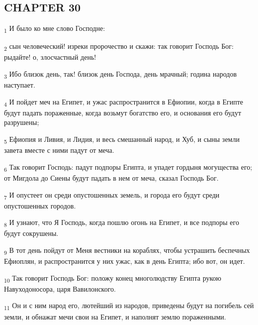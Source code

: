 \subsection{CHAPTER 30}
\begin{tcolorbox}
\textsubscript{1} И было ко мне слово Господне:
\end{tcolorbox}
\begin{tcolorbox}
\textsubscript{2} сын человеческий! изреки пророчество и скажи: так говорит Господь Бог: рыдайте! о, злосчастный день!
\end{tcolorbox}
\begin{tcolorbox}
\textsubscript{3} Ибо близок день, так! близок день Господа, день мрачный; година народов наступает.
\end{tcolorbox}
\begin{tcolorbox}
\textsubscript{4} И пойдет меч на Египет, и ужас распространится в Ефиопии, когда в Египте будут падать пораженные, когда возьмут богатство его, и основания его будут разрушены;
\end{tcolorbox}
\begin{tcolorbox}
\textsubscript{5} Ефиопия и Ливия, и Лидия, и весь смешанный народ, и Хуб, и сыны земли завета вместе с ними падут от меча.
\end{tcolorbox}
\begin{tcolorbox}
\textsubscript{6} Так говорит Господь: падут подпоры Египта, и упадет гордыня могущества его; от Мигдола до Сиены будут падать в нем от меча, сказал Господь Бог.
\end{tcolorbox}
\begin{tcolorbox}
\textsubscript{7} И опустеет он среди опустошенных земель, и города его будут среди опустошенных городов.
\end{tcolorbox}
\begin{tcolorbox}
\textsubscript{8} И узнают, что Я Господь, когда пошлю огонь на Египет, и все подпоры его будут сокрушены.
\end{tcolorbox}
\begin{tcolorbox}
\textsubscript{9} В тот день пойдут от Меня вестники на кораблях, чтобы устрашить беспечных Ефиоплян, и распространится у них ужас, как в день Египта; ибо вот, он идет.
\end{tcolorbox}
\begin{tcolorbox}
\textsubscript{10} Так говорит Господь Бог: положу конец многолюдству Египта рукою Навуходоносора, царя Вавилонского.
\end{tcolorbox}
\begin{tcolorbox}
\textsubscript{11} Он и с ним народ его, лютейший из народов, приведены будут на погибель сей земли, и обнажат мечи свои на Египет, и наполнят землю пораженными.
\end{tcolorbox}
